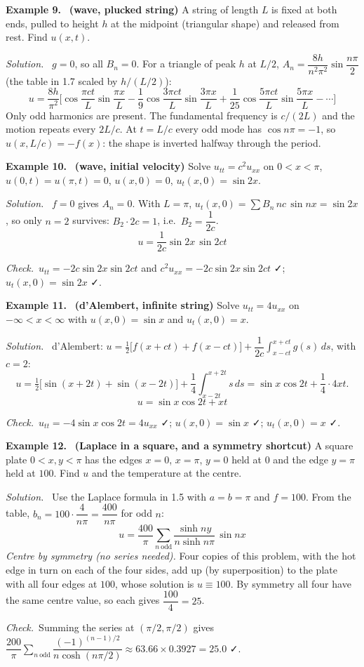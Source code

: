 \documentclass[11pt]{article}
\newcommand{\ex}[1]{\Needspace{7\baselineskip}\vspace{0.9em}\par\noindent\textbf{Example #1.}\ }
\newcommand{\sol}{\par\vspace{2pt}\noindent\textit{Solution.}\ }
\newcommand{\chk}{\par\noindent\textit{Check.}\ }
\begin{document}
\ex{9}
\textbf{(wave, plucked string)} A string of length $L$ is fixed at both ends, pulled to height $h$ at the midpoint (triangular shape) and released from rest. Find $u(x,t)$.
\sol
$g=0$, so all $B_n=0$. For a triangle of peak $h$ at $L/2$, $A_n=\dfrac{8h}{n^2\pi^2}\sin\dfrac{n\pi}{2}$ (the table in 1.7 scaled by $h/(L/2)$):
\[
\boxed{u=\frac{8h}{\pi^2}\Big[\cos\frac{\pi ct}{L}\sin\frac{\pi x}{L}-\frac19\cos\frac{3\pi ct}{L}\sin\frac{3\pi x}{L}+\frac1{25}\cos\frac{5\pi ct}{L}\sin\frac{5\pi x}{L}-\cdots\Big]}
\]
Only odd harmonics are present. The fundamental frequency is $c/(2L)$ and the motion repeats every $2L/c$. At $t=L/c$ every odd mode has $\cos n\pi=-1$, so $u(x,L/c)=-f(x)$: the shape is inverted halfway through the period.

\ex{10}
\textbf{(wave, initial velocity)} Solve $u_{tt}=c^2u_{xx}$ on $0<x<\pi$, $u(0,t)=u(\pi,t)=0$, $u(x,0)=0$, $u_t(x,0)=\sin2x$.
\sol
$f=0$ gives $A_n=0$. With $L=\pi$, $u_t(x,0)=\sum B_n\,nc\,\sin nx=\sin2x$, so only $n=2$ survives: $B_2\cdot2c=1$, i.e.\ $B_2=\dfrac1{2c}$.
\[
\boxed{u=\frac{1}{2c}\sin2x\,\sin2ct}
\]
\chk $u_{tt}=-2c\sin2x\sin2ct$ and $c^2u_{xx}=-2c\sin2x\sin2ct$ ✓; $u_t(x,0)=\sin2x$ ✓.

\ex{11}
\textbf{(d'Alembert, infinite string)} Solve $u_{tt}=4u_{xx}$ on $-\infty<x<\infty$ with $u(x,0)=\sin x$ and $u_t(x,0)=x$.
\sol
d'Alembert: $u=\tfrac12\big[f(x+ct)+f(x-ct)\big]+\dfrac{1}{2c}\displaystyle\int_{x-ct}^{x+ct}g(s)\,ds$, with $c=2$:
\[
u=\tfrac12\big[\sin(x+2t)+\sin(x-2t)\big]+\frac14\int_{x-2t}^{x+2t}s\,ds=\sin x\cos2t+\frac14\cdot4xt .
\]
\[
\boxed{u=\sin x\cos2t+xt}
\]
\chk $u_{tt}=-4\sin x\cos2t=4u_{xx}$ ✓; $u(x,0)=\sin x$ ✓; $u_t(x,0)=x$ ✓.

\ex{12}
\textbf{(Laplace in a square, and a symmetry shortcut)} A square plate $0<x,y<\pi$ has the edges $x=0$, $x=\pi$, $y=0$ held at $0$ and the edge $y=\pi$ held at $100$. Find $u$ and the temperature at the centre.
\sol
Use the Laplace formula in 1.5 with $a=b=\pi$ and $f=100$. From the table, $b_n=100\cdot\dfrac{4}{n\pi}=\dfrac{400}{n\pi}$ for odd $n$:
\[
\boxed{u=\frac{400}{\pi}\sum_{n\ \mathrm{odd}}\frac{\sinh ny}{n\sinh n\pi}\,\sin nx}
\]
\emph{Centre by symmetry (no series needed).} Four copies of this problem, with the hot edge in turn on each of the four sides, add up (by superposition) to the plate with all four edges at $100$, whose solution is $u\equiv100$. By symmetry all four have the same centre value, so each gives $\dfrac{100}{4}=\boxed{25}$.
\chk Summing the series at $(\pi/2,\pi/2)$ gives $\dfrac{200}{\pi}\sum_{n\ \mathrm{odd}}\dfrac{(-1)^{(n-1)/2}}{n\cosh(n\pi/2)}\approx63.66\times0.3927=25.0$ ✓.
\end{document}
